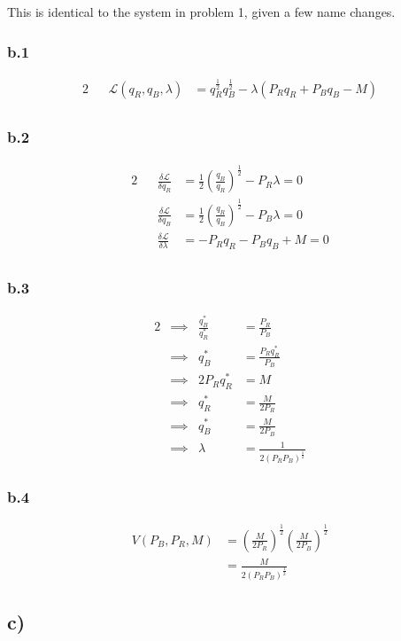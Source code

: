 \documentclass[12pt,letterpaper]{article}
\theoremstyle{definition}
\newcommand{\Lag}{\mathcal{L}}
\begin{document}
This is identical to the system in problem 1, given a few name changes.

\subsubsection*{b.1}
\begin{alignat*}{2}
  && \Lag(q_R,q_B,\lambda) &= q_R^{\frac{1}{2}}q_B^{\frac{1}{2}} - \lambda(P_Rq_R + P_Bq_B - M) \\
\end{alignat*}
\subsubsection*{b.2}
\begin{alignat*}{2}
  && \frac{\delta \Lag}{\delta q_R} &= \frac{1}{2}(\frac{q_B}{q_R})^{\frac{1}{2}} -
  P_R\lambda = 0 \\
  && \frac{\delta \Lag}{\delta q_B} &= \frac{1}{2}(\frac{q_R}{q_B})^{\frac{1}{2}} -
  P_B\lambda = 0\\
  && \frac{\delta \Lag}{\delta \lambda} &= -P_Rq_R - P_Bq_B + M = 0 \\
\end{alignat*}
\subsubsection*{b.3}
\begin{alignat*}{2}
  &\implies& \frac{q_B^*}{q_R^*} &= \frac{P_R}{P_B} \\
  &\implies& q_B^* &= \frac{P_Rq_R^*}{P_B} \\
  &\implies& 2P_Rq_R^* &= M \\
  &\implies& q_R^* &= \frac{M}{2P_R}\\
  &\implies& q_B^* &= \frac{M}{2P_B} \\
  &\implies& \lambda &= \frac{1}{2(P_RP_B)^{\frac{1}{2}}}
\end{alignat*}

\subsubsection*{b.4}

\begin{align*}
  V(P_B,P_R,M) &= (\frac{M}{2P_R})^{\frac{1}{2}}(\frac{M}{2P_B})^{\frac{1}{2}}
  \\
               &= \frac{M}{2(P_RP_B)^{\frac{1}{2}}}
\end{align*}

\subsection*{c)}
\end{document}
